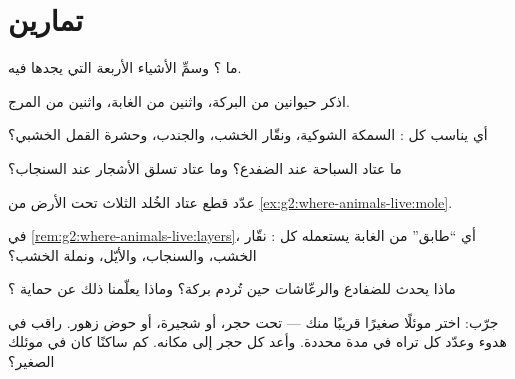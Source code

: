 \section{تمارين}

\begin{exercise}[$\star$]\label{exo:g2:where-animals-live:1}
ما ؟ وسمِّ الأشياء الأربعة التي يجدها  فيه.
\end{exercise}

\begin{exercise}[$\star$]\label{exo:g2:where-animals-live:2}
اذكر حيوانين من البركة، واثنين من الغابة، واثنين من المرج.
\end{exercise}

\begin{exercise}[$\star$]\label{exo:g2:where-animals-live:3}
أي  يناسب كل : السمكة الشوكية، ونقّار الخشب، والجندب،
وحشرة القمل الخشبي؟
\end{exercise}

\begin{exercise}[$\star$]\label{exo:g2:where-animals-live:4}
ما عتاد السباحة عند الضفدع؟ وما عتاد تسلق الأشجار عند السنجاب؟
\end{exercise}

\begin{exercise}[$\star$]\label{exo:g2:where-animals-live:5}
عدّد قطع عتاد الخُلد الثلاث تحت الأرض من
\cref{ex:g2:where-animals-live:mole}.
\end{exercise}

\begin{exercise}[$\star$]\label{exo:g2:where-animals-live:6}
في \cref{rem:g2:where-animals-live:layers}، أي ``طابق'' من الغابة
يستعمله كل : نقّار الخشب، والسنجاب، والأيّل، ونملة الخشب؟
\end{exercise}

\begin{exercise}[$\star$]\label{exo:g2:where-animals-live:7}
ماذا يحدث للضفادع والرعّاشات حين تُردم بركة؟ وماذا يعلّمنا ذلك عن
حماية ؟
\end{exercise}

\begin{exercise}[$\star$]\label{exo:g2:where-animals-live:8}
جرّب: اختر موئلًا صغيرًا قريبًا منك --- تحت حجر، أو شجيرة، أو حوض
زهور. راقب في هدوء وعدّد كل  تراه في مدة محددة. وأعد كل حجر
إلى مكانه. كم ساكنًا كان في موئلك الصغير؟
\end{exercise}

